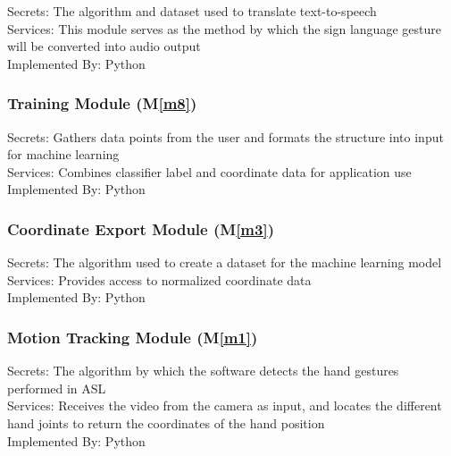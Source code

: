 \documentclass[12pt, titlepage]{article}
\newcommand{\mref}[1]{M\ref{#1}}
\begin{document}
\begin{description}
  \item[Secrets: The algorithm and dataset used to translate text-to-speech]
  \item[Services: This module serves as the method by which the sign language gesture will be converted into audio output] 
  \item[Implemented By: Python] 
  \end{description}  
  
\subsubsection{Training Module (\mref{m8})}

\begin{description}
  \item[Secrets: Gathers data points from the user and formats the structure into input for machine learning]
  \item[Services: Combines classifier label and coordinate data for application use] 
  \item[Implemented By: Python] 
  \end{description}
  


\subsubsection{Coordinate Export Module (\mref{m3})}
\begin{description}
  \item[Secrets: The algorithm used to create a dataset for the machine learning model]
  \item[Services: Provides access to normalized coordinate data] 
  \item[Implemented By: Python] 
  \end{description}
  


\subsubsection{Motion Tracking Module (\mref{m1})}

\begin{description}
  \item[Secrets: The algorithm by which the software detects the hand gestures performed in ASL]
  \item[Services: Receives the video from the camera as input, and locates the different hand joints to return the coordinates of the hand position] 
  \item[Implemented By: Python] 
  \end{description}
  
\end{document}

